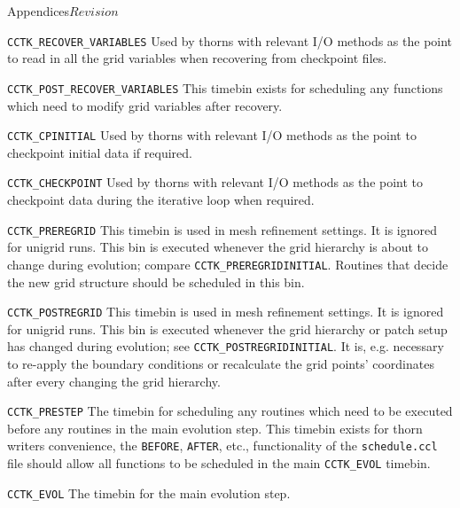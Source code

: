 \begin{cactuspart}{Appendices}{}{$Revision$}
\begin{Lentry}
\item[{\tt CCTK\_RECOVER\_VARIABLES}]
        Used by thorns with relevant I/O methods as the point 
        to read in all the grid variables when recovering from 
        checkpoint files.
        
\item[{\tt CCTK\_POST\_RECOVER\_VARIABLES}]
        This timebin exists for scheduling any functions which need 
        to modify grid variables after recovery.

\item[{\tt CCTK\_CPINITIAL}]
        Used by thorns with relevant I/O methods as the point to checkpoint
        initial data if required.

\item[{\tt CCTK\_CHECKPOINT}]
        Used by thorns with relevant I/O methods as the point to checkpoint
        data during the iterative loop when required.

\item[{\tt CCTK\_PREREGRID}]
        This timebin is used in mesh refinement settings.  It is
        ignored for unigrid runs.  This bin is executed whenever the
        grid hierarchy is about to change during evolution; compare
        {\tt CCTK\_PREREGRIDINITIAL}.  Routines that decide the
        new grid structure should be scheduled in this bin.

\item[{\tt CCTK\_POSTREGRID}]
        This timebin is used in mesh refinement settings.  It is
        ignored for unigrid runs.  This bin is executed whenever the
        grid hierarchy or patch setup has changed during evolution;
        see {\tt CCTK\_POSTREGRIDINITIAL}.  It is, e.g.
        necessary to re-apply the boundary conditions or recalculate
        the grid points' coordinates after every changing the grid
        hierarchy.
                
\item[{\tt CCTK\_PRESTEP}]
        The timebin for scheduling any routines which need to be 
        executed before any routines in the main evolution step. This 
        timebin exists for thorn writers convenience, the {\tt BEFORE}, 
        {\tt AFTER}, etc., functionality of the {\tt schedule.ccl} file
        should allow all functions to be scheduled in the main {\tt CCTK\_EVOL}
        timebin.
        
\item[{\tt CCTK\_EVOL}]
        The timebin for the main evolution step.
        

\end{Lentry}
\end{cactuspart}
